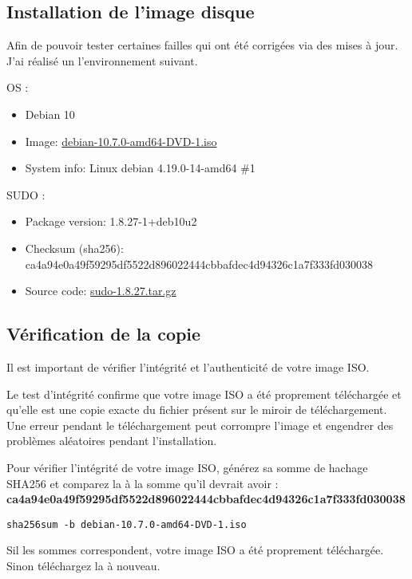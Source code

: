 \documentclass[a4paper, 12pt]{article}
\begin{document}
    \subsection{Installation de l'image disque}
    \begin{flushleft}
       \noindent Afin de pouvoir tester certaines failles qui ont été corrigées via des mises à jour. J'ai réalisé un l'environnement suivant. 
       \item OS : 
       \begin{itemize}
           \item  Debian 10
           \item Image: \href{https://cdimage.debian.org/mirror/cdimage/archive/10.7.0/amd64/iso-dvd/debian-10.7.0-amd64-DVD-1.iso}{debian-10.7.0-amd64-DVD-1.iso } \cite{CVE2021350:online}
           \item System info: Linux debian 4.19.0-14-amd64 \#1
       \end{itemize}
       \item SUDO : 
       \begin{itemize}
           \item Package version: 1.8.27-1+deb10u2
           \item Checksum (sha256): ca4a94e0a49f59295df5522d896022444cbbafdec4d94326c1a7f333fd030038
           \item Source code: \href{https://www.sudo.ws/dist/sudo-1.8.27.tar.gz}{sudo-1.8.27.tar.gz} \cite{CVE2021350:online}
       \end{itemize}

       \subsection{Vérification de la copie}
       \item Il est important de vérifier l’intégrité et l’authenticité de votre image ISO.
       \item Le test d’intégrité confirme que votre image ISO a été proprement téléchargée et qu’elle est une copie exacte du fichier présent sur le miroir de téléchargement. Une erreur pendant le téléchargement peut corrompre l’image et engendrer des problèmes aléatoires pendant l’installation.
       \item Pour vérifier l’intégrité de votre image ISO, générez sa somme de hachage SHA256 et comparez la à la somme qu'il devrait avoir : \textbf{ca4a94e0a49f59295df5522d896022444cbbafdec4d94326c1a7f333fd030038}
        \begin{lstlisting}
sha256sum -b debian-10.7.0-amd64-DVD-1.iso
        \end{lstlisting}
        \item Sil les sommes correspondent, votre image ISO a été proprement téléchargée. Sinon téléchargez la à nouveau. 
       

\end{flushleft}
\end{document}
